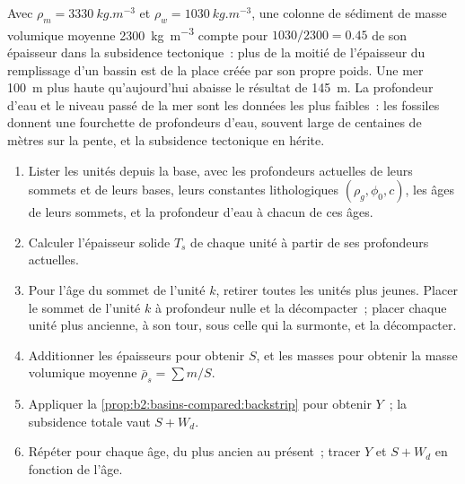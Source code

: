 Avec $\rho_m = \qty{3330}{kg.m^{-3}}$ et $\rho_w = \qty{1030}{kg.m^{-3}}$, une colonne de sédiment de masse volumique
moyenne \qty{2300}{kg.m^{-3}} compte pour $1030/2300 = 0.45$ de son épaisseur dans la subsidence
tectonique~: plus de la moitié de l'épaisseur du remplissage d'un bassin est de la place créée par son propre poids.
Une mer \qty{100}{m} plus haute qu'aujourd'hui abaisse le résultat de \qty{145}{m}. La profondeur d'eau et le niveau
passé de la mer sont les données les plus faibles~: les fossiles donnent une fourchette de profondeurs d'eau, souvent large de
centaines de mètres sur la pente, et la subsidence tectonique en hérite.

\begin{method}\label{met:b2:basins-compared:backstrip}
\begin{enumerate}
  \item Lister les unités depuis la base, avec les profondeurs actuelles de leurs sommets et de leurs bases, leurs
        constantes lithologiques $(\rho_g, \phi_0, c)$, les âges de leurs sommets, et la profondeur d'eau à
        chacun de ces âges.
  \item Calculer l'épaisseur solide $T_s$ de chaque unité à partir de ses profondeurs actuelles.
  \item Pour l'âge du sommet de l'unité $k$, retirer toutes les unités plus jeunes. Placer le sommet de l'unité
        $k$ à profondeur nulle et la décompacter~; placer chaque unité plus ancienne, à son tour, sous celle qui la
        surmonte, et la décompacter.
  \item Additionner les épaisseurs pour obtenir $S$, et les masses pour obtenir la masse volumique moyenne
        $\bar\rho_s = \sum m / S$.
  \item Appliquer la \cref{prop:b2:basins-compared:backstrip} pour obtenir $Y$~; la subsidence totale vaut
        $S + W_d$.
  \item Répéter pour chaque âge, du plus ancien au présent~; tracer $Y$ et $S + W_d$ en fonction de l'âge.
\end{enumerate}
\end{method}

